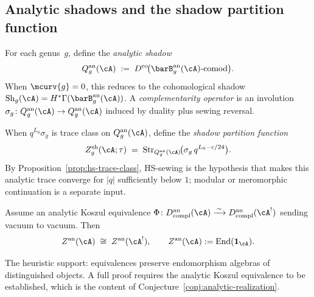 \subsection{Analytic shadows and the shadow partition function}%
\label{subsec:analytic-shadows}%

\begin{definition}%
\label{def:analytic-shadow}%
For each genus~$g$, define the \emph{analytic shadow}
\[
Q_g^{\mathrm{an}}(\cA)
\;:=\;
D^{\mathrm{co}}\!\bigl(
\barB_g^{\mathrm{an}}(\cA)\text{-comod}\bigr).
\]
When $\mcurv{g} = 0$, this reduces to the cohomological shadow
$\operatorname{Sh}_g(\cA) = H^*\Gamma(\barB_g^{\mathrm{an}}(\cA))$.
A \emph{complementarity operator} is an involution
$\sigma_g \colon Q_g^{\mathrm{an}}(\cA) \to Q_g^{\mathrm{an}}(\cA)$
induced by duality plus sewing reversal.
\end{definition}

\begin{definition}%
\label{def:shadow-partition-function}%
%
When $q^{L_0}\sigma_g$ is trace class on $Q_g^{\mathrm{an}}(\cA)$,
define the \emph{shadow partition function}
\begin{equation}\label{eq:shadow-partition-function}
Z_g^{\mathrm{sh}}(\cA; \tau)
\;=\;
\operatorname{Str}_{Q_g^{\mathrm{an}}(\cA)}
\!\bigl(\sigma_g\, q^{L_0 - c/24}\bigr).
\end{equation}
By Proposition~\ref{prop:hs-trace-class}, HS-sewing is the hypothesis
that makes this analytic trace converge for $|q|$ sufficiently below
$1$; modular or meromorphic continuation is a separate input.
\end{definition}

\begin{conjecture}\label{conj:analytic-center-invariance}%
Assume an analytic Koszul equivalence
$\Phi \colon D^{\mathrm{an}}_{\mathrm{compl}}(\cA)
\xrightarrow{\,\sim\,}
D^{\mathrm{an}}_{\mathrm{compl}}(\cA^!)$
sending vacuum to vacuum. Then
\[
Z^{\mathrm{an}}(\cA) \;\cong\; Z^{\mathrm{an}}(\cA^!),
\qquad
Z^{\mathrm{an}}(\cA) := \operatorname{End}(\mathbf{1}_\cA).
\]
\end{conjecture}

\begin{remark}
The heuristic support: equivalences preserve endomorphism algebras of
distinguished objects. A full proof requires the analytic Koszul
equivalence to be established, which is the content of
Conjecture~\ref{conj:analytic-realization}.
\end{remark}

